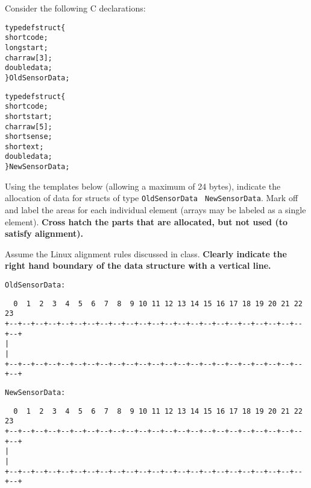 \begin{problem}{9}
Consider the following C declarations:

\begin{ccode}
\begin{alltt}
typedef struct \verb:{:
    short code;
    long start;
    char raw[3];
    double data;
\verb:}: OldSensorData;

typedef struct \verb:{:
    short code;
    short start;
    char raw[5];
    short sense;
    short ext;
    double data;
\verb:}: NewSensorData;
\end{alltt}
\end{ccode}

\end{problem}

\begin{subproblem}

\item
Using the templates below (allowing a maximum of 24 bytes), indicate
the allocation of data for structs of type {\tt OldSensorData} {\tt
NewSensorData}.  Mark off and label the areas for each individual
element (arrays may be labeled as a single element).  {\bf Cross hatch the
parts that are allocated, but not used (to satisfy alignment).}

Assume the Linux alignment rules discussed in class.  {\bf Clearly
indicate the right hand boundary of the data structure with a vertical
line.}

{\tt OldSensorData:}

{\small
\begin{verbatim}
  0  1  2  3  4  5  6  7  8  9 10 11 12 13 14 15 16 17 18 19 20 21 22 23 
+--+--+--+--+--+--+--+--+--+--+--+--+--+--+--+--+--+--+--+--+--+--+--+--+
|                                                                       |
+--+--+--+--+--+--+--+--+--+--+--+--+--+--+--+--+--+--+--+--+--+--+--+--+
\end{verbatim}
}

{\tt NewSensorData:}

{\small
\begin{verbatim}
  0  1  2  3  4  5  6  7  8  9 10 11 12 13 14 15 16 17 18 19 20 21 22 23 
+--+--+--+--+--+--+--+--+--+--+--+--+--+--+--+--+--+--+--+--+--+--+--+--+
|                                                                       |
+--+--+--+--+--+--+--+--+--+--+--+--+--+--+--+--+--+--+--+--+--+--+--+--+
\end{verbatim}
}


\answer{


}
\end{subproblem}
